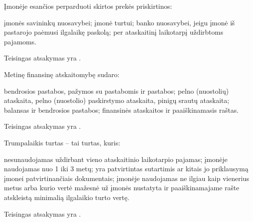 \begin{tasks}
  \begin{task}
    \begin{condition}
      Įmonėje esančios perparduoti skirtos prekės priskirtinos:
      \begin{enumerate}
         įmonės savininkų nuosavybei;
         įmonė turtui;
         banko nuosavybei, jeigu įmonė iš pastarojo paėmusi
          ilgalaikę paskolą;
         per ataskaitinį laikotarpį uždirbtoms pajamoms.
      \end{enumerate}
    \end{condition}
    \begin{solution}
      Teisingas atsakymas yra .
    \end{solution}
  \end{task}

  \begin{task}
    \begin{condition}
      Metinę finansinę atskaitomybę sudaro:
      \begin{enumerate}
         bendrosios pastabos, pažymos su pastabomis ir
          pastabos;
         pelno (nuostolių) ataskaita, pelno (nuostolio)
          paskirstymo ataskaita, pinigų srautų ataskaita;
         balansas ir bendrosios pastabos;
         finansinės ataskaitos ir paaiškinamasis raštas.
      \end{enumerate}
    \end{condition}
    \begin{solution}
      Teisingas atsakymas yra .
    \end{solution}
  \end{task}

  \begin{task}
    \begin{condition}
      Trumpalaikis turtas – tai turtas, kuris:
      \begin{enumerate}
         nesunaudojamas uždirbant vieno ataskaitinio laikotarpio
          pajamas;
         įmonėje naudojamas nuo 1 iki 3 metų;
         yra patvirtintas sutartimis ar kitais jo priklausymą
          įmonei patvirtinančiais dokumentais;
         įmonėje naudojamas ne ilgiau kaip vienerius metus
          arba kurio vertė mažesnė už įmonės nustatyta ir 
          paaiškinamajame rašte atskleistą minimalią ilgalaikio
          turto vertę.
      \end{enumerate}
    \end{condition}
    \begin{solution}
      Teisingas atsakymas yra .
    \end{solution}
  \end{task}


\end{tasks}
